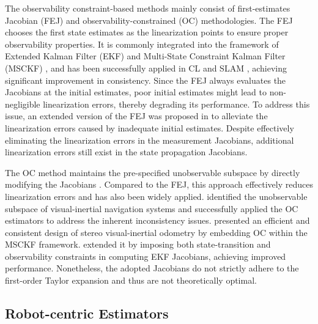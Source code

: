 \def\txtq#1{{\color{red} #1}}

The observability constraint-based methods mainly consist of first-estimates Jacobian (FEJ) \cite{B12, B7, B8, B14, B18, B34} and observability-constrained (OC) \cite{B6, B13, B41, B42, B58} methodologies. The FEJ chooses the first state estimates as the linearization points to ensure proper observability properties. It is commonly integrated into the framework of Extended Kalman Filter (EKF) and Multi-State Constraint Kalman Filter (MSCKF) \cite{B34}, and has been successfully applied in CL \cite{B7, B8} and SLAM \cite{B12, B14}, achieving significant improvement in consistency. Since the FEJ always evaluates the Jacobians at the initial estimates, poor initial estimates might lead to non-negligible linearization errors, thereby degrading its performance. To address this issue, an extended version of the FEJ was proposed in \cite{B18} to alleviate the linearization errors caused by inadequate initial estimates. Despite effectively eliminating the linearization errors in the measurement Jacobians, additional linearization errors still exist in the state propagation Jacobians.

The OC method maintains the pre-specified unobservable subspace by directly modifying the Jacobians \cite{B6, B13, B41, B42, B58}. Compared to the FEJ, this approach effectively reduces linearization errors and has also been widely applied. \cite{B6, B13} identified the unobservable subspace of visual-inertial navigation systems and successfully applied the OC estimators to address the inherent inconsistency issues. \cite{B41} presented an efficient and consistent design of stereo visual-inertial odometry by embedding OC within the MSCKF framework. \cite{B58} extended it by imposing both state-transition and observability constraints in computing EKF Jacobians, achieving improved performance. Nonetheless, the adopted Jacobians do not strictly adhere to the first-order Taylor expansion and thus are not theoretically optimal.

\subsection{Robot-centric Estimators}

